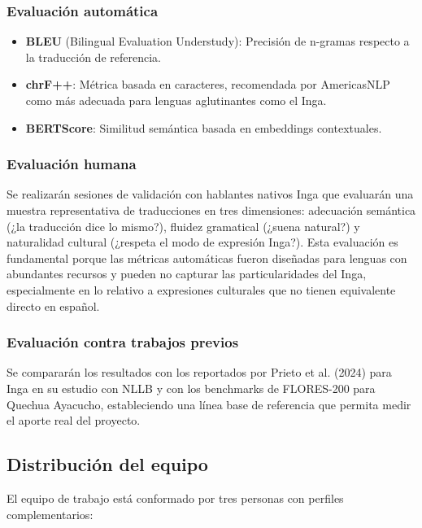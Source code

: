 \documentclass[12pt,a4paper]{article}
\begin{document}
\subsubsection{Evaluación automática}

\begin{itemize}
    \item \textbf{BLEU} (Bilingual Evaluation Understudy): Precisión de n-gramas respecto a la traducción de referencia.
    \item \textbf{chrF++}: Métrica basada en caracteres, recomendada por AmericasNLP como más adecuada para lenguas aglutinantes como el Inga.
    \item \textbf{BERTScore}: Similitud semántica basada en embeddings contextuales.
\end{itemize}

\subsubsection{Evaluación humana}

Se realizarán sesiones de validación con hablantes nativos Inga que evaluarán una muestra representativa de traducciones en tres dimensiones: adecuación semántica (¿la traducción dice lo mismo?), fluidez gramatical (¿suena natural?) y naturalidad cultural (¿respeta el modo de expresión Inga?). Esta evaluación es fundamental porque las métricas automáticas fueron diseñadas para lenguas con abundantes recursos y pueden no capturar las particularidades del Inga, especialmente en lo relativo a expresiones culturales que no tienen equivalente directo en español.

\subsubsection{Evaluación contra trabajos previos}

Se compararán los resultados con los reportados por Prieto et al. (2024) para Inga en su estudio con NLLB y con los benchmarks de FLORES-200 para Quechua Ayacucho, estableciendo una línea base de referencia que permita medir el aporte real del proyecto.

\subsection{Distribución del equipo}

El equipo de trabajo está conformado por tres personas con perfiles complementarios:
\end{document}
